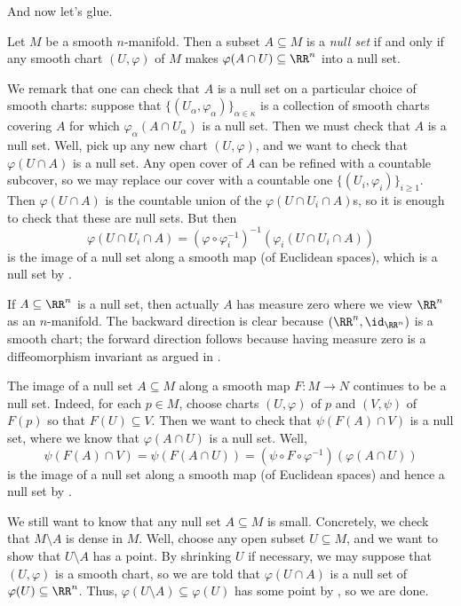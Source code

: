 \documentclass[../notes.tex]{subfiles}
\begin{document}
And now let's glue.
\begin{definition}
	Let $M$ be a smooth $n$-manifold. Then a subset $A\subseteq M$ is a \textit{null set} if and only if any smooth chart $(U,\varphi)$ of $M$ makes $\varphi(A\cap U)\subseteq\RR^n$ into a null set.
\end{definition}
\begin{remark}
	We remark that one can check that $A$ is a null set on a particular choice of smooth charts: suppose that $\{(U_\alpha,\varphi_\alpha)\}_{\alpha\in\kappa}$ is a collection of smooth charts covering $A$ for which $\varphi_\alpha(A\cap U_\alpha)$ is a null set. Then we must check that $A$ is a null set. Well, pick up any new chart $(U,\varphi)$, and we want to check that $\varphi(U\cap A)$ is a null set. Any open cover of $A$ can be refined with a countable subcover, so we may replace our cover with a countable one $\{(U_i,\varphi_i)\}_{i\ge1}$. Then $\varphi(U\cap A)$ is the countable union of the $\varphi(U\cap U_i\cap A)$s, so it is enough to check that these are null sets. But then
	\[\varphi(U\cap U_i\cap A)=\left(\varphi\circ\varphi_i^{-1}\right)^{-1}\left(\varphi_i(U\cap U_i\cap A)\right)\]
	is the image of a null set along a smooth map (of Euclidean spaces), which is a null set by .
\end{remark}
\begin{remark}
	If $A\subseteq\RR^n$ is a null set, then actually $A$ has measure zero where we view $\RR^n$ as an $n$-manifold. The backward direction is clear because $(\RR^n,{\id_{\RR^n}})$ is a smooth chart; the forward direction follows because having measure zero is a diffeomorphism invariant as argued in .
\end{remark}
\begin{remark}
	The image of a null set $A\subseteq M$ along a smooth map $F\colon M\to N$ continues to be a null set. Indeed, for each $p\in M$, choose charts $(U,\varphi)$ of $p$ and $(V,\psi)$ of $F(p)$ so that $F(U)\subseteq V$. Then we want to check that $\psi(F(A)\cap V)$ is a null set, where we know that $\varphi(A\cap U)$ is a null set. Well,
	\[\psi(F(A)\cap V)=\psi(F(A\cap U))=\left(\psi\circ F\circ\varphi^{-1}\right)(\varphi(A\cap U))\]
	is the image of a null set along a smooth map (of Euclidean spaces) and hence a null set by .
\end{remark}
\begin{remark}
	We still want to know that any null set $A\subseteq M$ is small. Concretely, we check that $M\setminus A$ is dense in $M$. Well, choose any open subset $U\subseteq M$, and we want to show that $U\setminus A$ has a point. By shrinking $U$ if necessary, we may suppose that $(U,\varphi)$ is a smooth chart, so we are told that $\varphi(U\cap A)$ is a null set of $\varphi(U)\subseteq\RR^n$. Thus, $\varphi(U\setminus A)\subseteq\varphi(U)$ has some point by , so we are done.
\end{remark}
\end{document}
